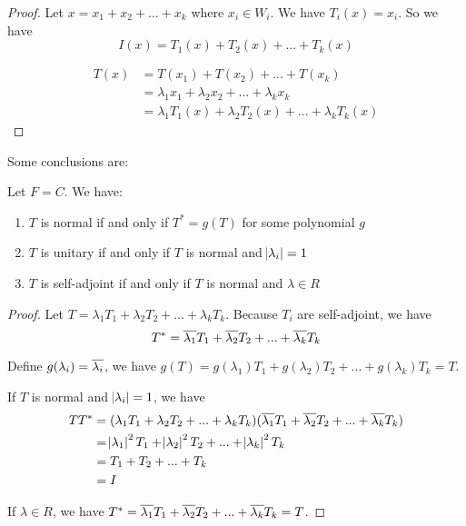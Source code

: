 \begin{proof}
    Let $x = x_1 + x_2 + ... + x_k$ where $x_i \in W_i$. We have $T_i (x) = x_i$. So we have
    \begin{equation*}
        I(x) = T_1 (x) + T_2 (x) + ... + T_k (x)
    \end{equation*}
   
    \begin{equation*}
        \begin{aligned}
            T(x) &= T(x_1) + T(x_2) + ... + T(x_k) \\
            &= \lambda_1 x_1 + \lambda_2 x_2 + ... + \lambda_k x_k \\
            &= \lambda_1 T_1 (x) + \lambda_2 T_2 (x) + ... + \lambda_k T_k (x)
        \end{aligned}        
    \end{equation*}
\end{proof}


Some conclusions are:
\begin{theorem}
    Let $F = C$. We have:
    \begin{enumerate}
        \item $T$ is normal if and only if $T^* = g(T)$ for some polynomial $g$
        \item $T$ is unitary if and only if $T$ is normal and $\abs{\lambda_i} = 1$
        \item $T$ is self-adjoint if and only if $T$ is normal and $\lambda \in R$
    \end{enumerate}    
\end{theorem}
\begin{proof}
    Let $T = \lambda_1 T_1 + \lambda_2 T_2 + ... + \lambda_k T_k$. Because $T_i$ are self-adjoint, we have
    \begin{equation}
        T^* = \overline{\lambda_1} T_1 + \overline{\lambda_2} T_2 + ... + \overline{\lambda_k} T_k
    \end{equation}
    
    Define $g(\lambda_i) = \overline{\lambda_i}$, we have $g(T) = g(\lambda_1) T_1 + g(\lambda_2) T_2 + ... + g(\lambda_k) T_k = T$.
    
    If $T$ is normal and $\abs{\lambda_i} = 1$, we have 
    \begin{equation*}
        \begin{aligned}
            TT^* &= (\lambda_1 T_1 + \lambda_2 T_2 + ... + \lambda_k T_k) (\overline{\lambda_1} T_1 + \overline{\lambda_2} T_2 + ... + \overline{\lambda_k} T_k) \\
            &= \abs{\lambda_1}^2 T_1 + \abs{\lambda_2}^2 T_2 + ... + \abs{\lambda_k}^2 T_k \\
            &= T_1 + T_2 + ... + T_k \\
            &= I
        \end{aligned}        
    \end{equation*}
    
    If $\lambda \in R$, we have $T^* = \overline{\lambda_1} T_1 + \overline{\lambda_2} T_2 + ... + \overline{\lambda_k} T_k = T$.
\end{proof}



